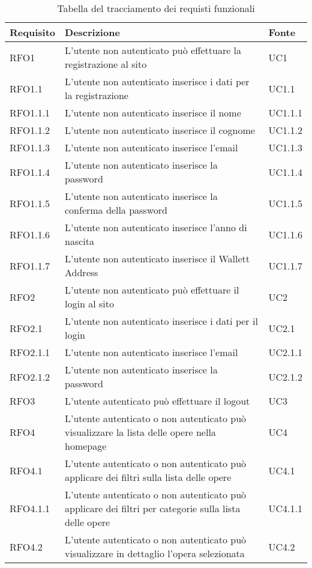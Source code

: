 \begin{table}[H]
\caption{Tabella del tracciamento dei requisti funzionali}
\label{tab:requisiti-funzionali}
\renewcommand{\arraystretch}{1.6}
\begin{tabularx}{\textwidth}{lXl}
\hline\hline
\textbf{Requisito} & \textbf{Descrizione} & \textbf{Fonte}\\
\hline
RFO1 & L'utente non autenticato può effettuare la registrazione al sito & UC1 \\
\hline
RFO1.1 & L'utente non autenticato inserisce i dati per la registrazione & UC1.1 \\
\hline
RFO1.1.1 & L'utente non autenticato inserisce il nome & UC1.1.1 \\
\hline
RFO1.1.2 & L'utente non autenticato inserisce il cognome & UC1.1.2 \\
\hline
RFO1.1.3 & L'utente non autenticato inserisce l'email & UC1.1.3 \\
\hline
RFO1.1.4 & L'utente non autenticato inserisce la password & UC1.1.4 \\
\hline
RFO1.1.5 & L'utente non autenticato inserisce la conferma della password & UC1.1.5 \\
\hline
RFO1.1.6 & L'utente non autenticato inserisce l'anno di nascita & UC1.1.6 \\
\hline
RFO1.1.7 & L'utente non autenticato inserisce il Wallett Address & UC1.1.7 \\
\hline
RFO2 & L'utente non autenticato può effettuare il login al sito & UC2 \\
\hline
RFO2.1 &L'utente non autenticato inserisce i dati per il login & UC2.1 \\
\hline
RFO2.1.1 & L'utente non autenticato inserisce l'email & UC2.1.1 \\
\hline
RFO2.1.2 & L'utente non autenticato inserisce  la password & UC2.1.2 \\
\hline
RFO3 & L'utente autenticato può effettuare il logout & UC3 \\
\hline
RFO4 & L'utente autenticato o non autenticato può visualizzare la lista delle opere nella homepage & UC4 \\
\hline
RFO4.1 & L'utente autenticato o non autenticato può applicare dei filtri sulla lista delle opere & UC4.1 \\
\hline
RFO4.1.1 & L'utente autenticato o non autenticato può applicare dei filtri per categorie sulla lista delle opere & UC4.1.1 \\
\hline
RFO4.2 & L'utente autenticato o non autenticato può visualizzare in dettaglio l'opera selezionata & UC4.2 \\

\end{tabularx}
\end{table}

